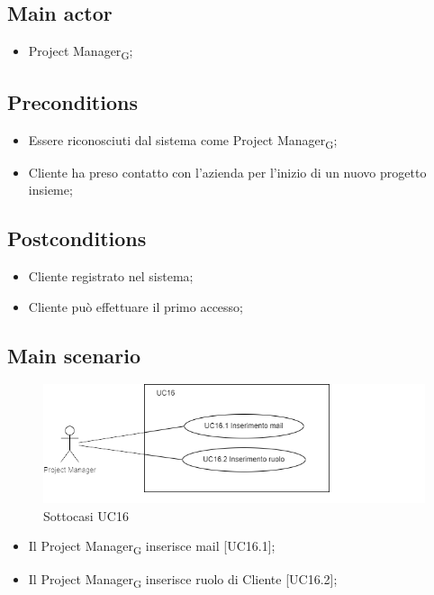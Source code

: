 \documentclass{article}
\begin{document}
    \subsection*{Main actor}
        \begin{itemize}
            \item Project Manager\textsubscript{G};
        \end{itemize}
        
    \subsection*{Preconditions}
        \begin{itemize}
            \item Essere riconosciuti dal sistema come Project Manager\textsubscript{G};
            \item Cliente ha preso contatto con l'azienda per l'inizio di un nuovo progetto insieme;
        \end{itemize}
        
    \subsection*{Postconditions}
        \begin{itemize}
            \item Cliente registrato nel sistema;
            \item Cliente può effettuare il primo accesso;
        \end{itemize}
    
    \subsection*{Main scenario}
        \begin{figure}[h]
          \centering
          \includegraphics{./imgUML/UC16-zoom.png}
          \caption{Sottocasi UC16}
          \label{fig:UC16_sottocasi}
        \end{figure}
        
        \begin{itemize}
            \item Il Project Manager\textsubscript{G} inserisce mail [UC16.1];
            \item Il Project Manager\textsubscript{G} inserisce ruolo di Cliente [UC16.2];
        \end{itemize}
        
\end{document}
